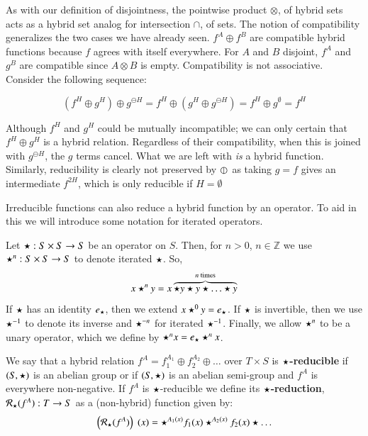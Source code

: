As with our definition of disjointness, the pointwise product $\otimes$, 
of hybrid sets acts as a hybrid set analog for intersection $\cap$, of sets.
The notion of compatibility generalizes the two cases we have already seen.
$f^A \oplus f^B$ are compatible hybrid functions because $f$ agrees with itself everywhere.
For $A$ and $B$ disjoint, $f^A$ and $g^B$ are compatible since $A \otimes B$ is empty.
Compatibility is not associative.
Consider the following sequence:


\begin{equation}
(f^H \oplus g^H) \oplus g^{\ominus H} = f^H \oplus (g^H \oplus g^{\ominus H}) = f^H \oplus g^\emptyset = f^H
\end{equation}


Although $f^H$ and $g^H$ could be mutually incompatible; 
we can only certain that $f^H \oplus g^H$ is a hybrid relation.
Regardless of their compatibility, when this is joined with $g^{\ominus H}$, the $g$ terms cancel.
What we are left with \emph{is} a hybrid function.
Similarly, reducibility is clearly not preserved by $\varobar^{}$ as taking $g=f$ gives an intermediate $f^{2H}$, 
which is only reducible if $H=\emptyset$


Irreducible functions can also reduce a hybrid function by an operator.
To aid in this we will introduce some notation for iterated operators.
\begin{definition}
	Let $\star : S \times S \to S$ be an operator on $S$.
	Then, for $n > 0$, $n \in \mathbb{Z}$ we use $\star^n:S \times S \to S$ to denote iterated $\star$.
	So,
	\begin{equation}
		x \star^n y = x \overbrace{\star y \star y \star \ldots \star y}^{n \text{ times}}
	\end{equation}
	If $\star$ has an identity $e_\star$, then we extend $x \star^0 y = e_\star$.
	If $\star$ is invertible, then we use $\star^{-1}$ to denote its inverse and $\star^{-n}$ for iterated $\star^{-1}$.
	Finally, we allow $\star^n$ to be a unary operator, which we define by $\star^n x = e_\star \star^n x$.
\end{definition}


\begin{definition}
	We say that a hybrid relation $f^A = f_1^{A_1} \oplus f_2^{A_2} \oplus \ldots$ over $T \times S$ 
	is $\star$\textbf{-reducible} if $(S, \star)$ is an abelian group 
	or if $(S, \star)$ is an abelian semi-group and $f^A$ is everywhere non-negative.
	If $f^A$ is $\star$-reducible we define its $\star$\textbf{-reduction}, $\mathcal{R}_\star(f^A) :  T \to S$ 
	as a (non-hybrid) function given by:
	\begin{equation}
		\left( \mathcal{R}_\star (f^A) \right)\;(x) = \star^{A_1(x)} f_1(x) \star^{A_2(x)} f_2(x) \star \ldots 
	\end{equation}
\end{definition}


